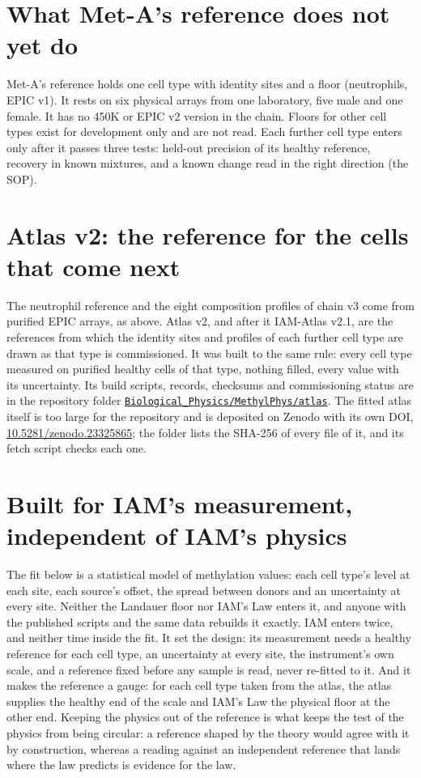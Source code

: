 \section{What Met-A's reference does not yet do}

Met-A's reference holds one cell type with identity sites and a floor (neutrophils, EPIC v1). It rests on six physical arrays from one laboratory, five male and one
female. It has no 450K or EPIC v2 version in the chain. Floors for other cell types exist for development only and are not read. Each further cell type enters only after it passes three tests:
held-out precision of its healthy reference, recovery in known mixtures, and a known change read in the right direction (the SOP). \openprob

\section{Atlas v2: the reference for the cells that come next}

The neutrophil reference and the eight composition profiles of chain v3 come from purified EPIC arrays, as above. Atlas v2, and after it IAM-Atlas v2.1, are the references from which the identity sites and profiles of each further cell type are drawn as that type is commissioned. It was built
to the same rule: every cell type measured on purified healthy cells of that type, nothing filled, every value with its uncertainty.
Its build scripts, records, checksums and commissioning status are in the repository folder
\href{https://github.com/hmahaffeyges/IAM-Validation/tree/main/Biological_Physics/MethylPhys/atlas}{\texttt{Biological\_Physics/MethylPhys/atlas}}.
The fitted atlas itself is too large for the repository and is deposited on Zenodo with its own DOI,
\href{https://doi.org/10.5281/zenodo.23325865}{10.5281/zenodo.23325865}; the folder lists the SHA-256 of every file of it, and its fetch script checks each one.

\section{Built for IAM's measurement, independent of IAM's physics}

The fit below is a statistical model of methylation values: each cell type's level at each site, each source's offset, the spread between
donors and an uncertainty at every site. Neither the Landauer floor nor IAM's Law enters it, and anyone with the published scripts and the same
data rebuilds it exactly. IAM enters twice, and neither time inside the fit. It set the design: its measurement needs a healthy reference for each
cell type, an uncertainty at every site, the instrument's own scale, and a reference fixed before any sample is read, never re-fitted to it. And
it makes the reference a gauge: for each cell type taken from the atlas, the atlas supplies the healthy end of the scale and IAM's Law the
physical floor at the other end. Keeping the physics out of the reference is what keeps the test of the physics from being circular: a
reference shaped by the theory would agree with it by construction, whereas a reading against an independent reference that lands where the
law predicts is evidence for the law.

